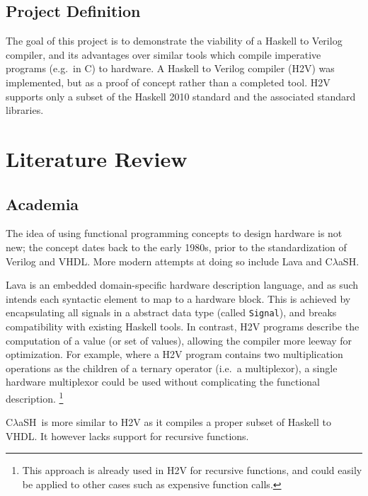 \documentclass[english,onecolumn]{scrartcl}
\begin{document}
\subsection{Project Definition}
The goal of this project is to demonstrate the viability of a Haskell to Verilog compiler, and its advantages over similar tools
which compile imperative programs (e.g.\ in C) to hardware. A Haskell to Verilog compiler (H2V) was implemented, but as a proof of
concept rather than a completed tool. H2V supports only a subset of the Haskell 2010 standard and the associated standard
libraries.


\section{Literature Review}

\newcommand\Clash{C\(\lambda\)aSH}

\subsection{Academia}
The idea of using functional programming concepts to design hardware is not new; the concept dates back to the early
1980s,\cite[1135]{sheeran} prior to the standardization of Verilog\cite{Verilog_std} and VHDL.\cite{VHDL_std}
More modern attempts at doing so include Lava\cite{lava} and \Clash.\cite{clash}

Lava is an embedded domain-specific hardware description language, and as such intends each syntactic element to map to a hardware
block. This is achieved by encapsulating all signals in a abstract data type (called \texttt{Signal}), and breaks
compatibility with existing Haskell tools.
In contrast, H2V programs describe the computation of a value (or set of values), allowing the compiler more leeway for optimization.
For example, where a H2V program contains two multiplication operations as the children of a ternary operator (i.e.\ a multiplexor),
a single hardware multiplexor could be used without complicating the functional description.%
\footnote{This approach is already used in H2V for recursive functions, and could easily be applied to other cases such as
    expensive function calls.}

\Clash\ is more similar to H2V as it compiles a proper subset of Haskell to VHDL. It however lacks support for recursive
functions.\cite{clashReference}
\end{document}
